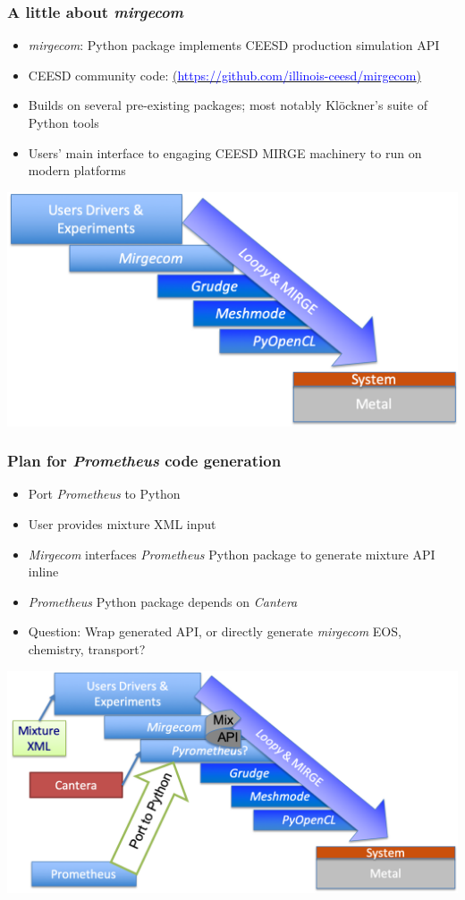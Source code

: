 \begin{frame}\frametitle{A little about \textit{mirgecom}}
\begin{multicols}{2}
\begin{itemize}
  \item \textit{mirgecom}: Python package implements CEESD production simulation API
  \item CEESD community code: \href{https://github.com/illinois-ceesd/mirgecom}{(\textcolor{blue}{https://github.com/illinois-ceesd/mirgecom})}
  \item Builds on several pre-existing packages; most notably Kl{\"o}ckner's suite of Python tools
  \item Users' main interface to engaging CEESD MIRGE machinery to run on modern platforms
\end{itemize}
\end{multicols}
\begin{center}
\includegraphics[width=.7\textwidth]{figures/mirgecom_cartoon.png}
\end{center}
\end{frame}

\begin{frame}\frametitle{Plan for \textit{Prometheus} code generation}
\begin{multicols}{2}
\begin{itemize}
  \item Port \textit{Prometheus} to Python
  \item User provides mixture XML input
  \item \textit{Mirgecom} interfaces \textit{Prometheus} Python package to generate mixture API inline
  \item \textit{Prometheus} Python package depends on \textit{Cantera}
  \item Question: Wrap generated API, or directly generate \textit{mirgecom} EOS, chemistry, transport?
\end{itemize}
\end{multicols}
\begin{center}
\includegraphics[width=.8\textwidth]{figures/ultimate_integration.png}
\end{center}
\end{frame}

